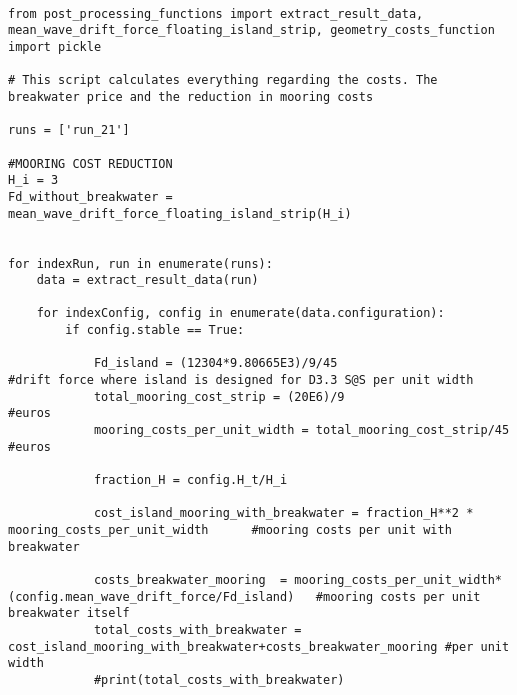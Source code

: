 \begin{mdframed}[backgroundcolor=light-gray, roundcorner=10pt,leftmargin=1, rightmargin=1, innerleftmargin=0, innertopmargin=7,innerbottommargin=0, outerlinewidth=1, linecolor=light-gray]
\begin{lstlisting}[linewidth=\columnwidth,caption=Costs post-processing ., label=script:Costs post-processing]

from post_processing_functions import extract_result_data, mean_wave_drift_force_floating_island_strip, geometry_costs_function
import pickle

# This script calculates everything regarding the costs. The breakwater price and the reduction in mooring costs

runs = ['run_21']

#MOORING COST REDUCTION
H_i = 3
Fd_without_breakwater = mean_wave_drift_force_floating_island_strip(H_i)


for indexRun, run in enumerate(runs):
    data = extract_result_data(run)

    for indexConfig, config in enumerate(data.configuration):
        if config.stable == True:

            Fd_island = (12304*9.80665E3)/9/45                                         #drift force where island is designed for D3.3 S@S per unit width
            total_mooring_cost_strip = (20E6)/9                         #euros
            mooring_costs_per_unit_width = total_mooring_cost_strip/45  #euros

            fraction_H = config.H_t/H_i

            cost_island_mooring_with_breakwater = fraction_H**2 * mooring_costs_per_unit_width      #mooring costs per unit with breakwater

            costs_breakwater_mooring  = mooring_costs_per_unit_width*  (config.mean_wave_drift_force/Fd_island)   #mooring costs per unit breakwater itself
            total_costs_with_breakwater = cost_island_mooring_with_breakwater+costs_breakwater_mooring #per unit width
            #print(total_costs_with_breakwater)



\end{lstlisting}
\end{mdframed}
